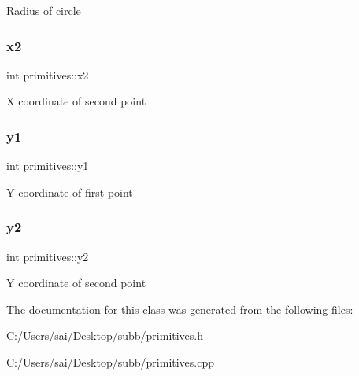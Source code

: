 Radius of circle \mbox{\label{classprimitives_ae3ac428b1195f1baf49fff4070c79280}} 
\subsubsection{\texorpdfstring{x2}{x2}}
{\footnotesize\ttfamily int primitives\+::x2\hspace{0.3cm}{\ttfamily [private]}}

X coordinate of second point \mbox{\label{classprimitives_a98cbb319f4fe40b7987d2c7bdfd9fa6a}} 
\subsubsection{\texorpdfstring{y1}{y1}}
{\footnotesize\ttfamily int primitives\+::y1\hspace{0.3cm}{\ttfamily [private]}}

Y coordinate of first point \mbox{\label{classprimitives_a77b49d02dc5171e8002222fe752c030e}} 
\subsubsection{\texorpdfstring{y2}{y2}}
{\footnotesize\ttfamily int primitives\+::y2\hspace{0.3cm}{\ttfamily [private]}}

Y coordinate of second point 

The documentation for this class was generated from the following files\+:\begin{DoxyCompactItemize}
\item 
C\+:/\+Users/sai/\+Desktop/subb/primitives.\+h\item 
C\+:/\+Users/sai/\+Desktop/subb/primitives.\+cpp\end{DoxyCompactItemize}
